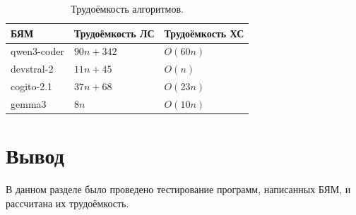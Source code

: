 \begin{table}[!htbp]
	\centering
	\caption{Трудоёмкость алгоритмов.}
	\label{t2}
	\small
	\begin{tabularx}{\textwidth}{|p{3cm}|*{2}{X|}}
		\hline
		\textbf{БЯМ} & \textbf{Трудоёмкость ЛС} & \textbf{Трудоёмкость ХС} \\\hline
		qwen3-coder & $90n + 342$ & $O(60n)$ \\\hline
		devstral-2 & $11n + 45$ & $O(n)$ \\\hline
		cogito-2.1 & $37n + 68$ & $O(23n)$ \\\hline
		gemma3 & $8n$ & $O(10n)$ \\\hline
	\end{tabularx}
\end{table}
\FloatBarrier

\section*{Вывод}

В данном разделе было проведено тестирование программ, написанных БЯМ, и рассчитана их трудоёмкость.

\clearpage
